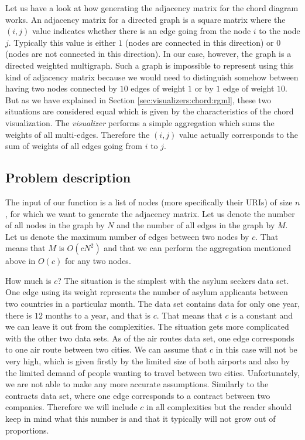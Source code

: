 Let us have a look at how generating the adjacency matrix for the chord diagram works. An adjacency matrix for a directed graph is a square matrix where the $(i, j)$ value indicates whether there is an edge going from the node $i$ to the node $j$. Typically this value is either $1$ (nodes are connected in this direction) or $0$ (nodes are not connected in this direction). In our case, however, the graph is a directed weighted multigraph. Such a graph is impossible to represent using this kind of adjacency matrix because we would need to distinguish somehow between having two nodes connected by $10$ edges of weight $1$ or by $1$ edge of weight $10$.  But as we have explained in Section \ref{sec:visualizers:chord:rgml}, these two situations are considered equal which is given by the characteristics of the chord visualization. The \emph{visualizer} performs a simple aggregation which sums the weights of all multi-edges. Therefore the $(i,j)$ value actually corresponds to the sum of weights of all edges going from $i$ to $j$.

\subsection{Problem description}

The input of our function is a list of nodes (more specifically their URIs) of size $n$, for which we want to generate the adjacency matrix. Let us denote the number of all nodes in the graph by $N$ and the number of all edges in the graph by $M$. Let us denote the maximum number of edges between two nodes by $c$. 
That means that $M$ is $O(cN^2)$ and that we can perform the aggregation mentioned above in $O(c)$ for any two nodes.

How much is $c$?  The situation is the simplest with the asylum seekers data set. One edge using its weight represents the number of asylum applicants between two countries in a particular month. The data set contains data for only one year, there is $12$ months to a year, and that is $c$. That means that $c$ is a constant and we can leave it out from the complexities. The situation gets more complicated with the other two data sets. As of the air routes data set, one edge corresponds to one air route between two cities. We can assume that $c$ in this case will not be very high, which is given firstly by the limited size of both airports and also by the limited demand of people wanting to travel between two cities. Unfortunately, we are not able to make any more accurate assumptions. Similarly to the contracts data set, where one edge corresponds to a contract between two companies. Therefore we will include $c$ in all complexities but the reader should keep in mind what this number is and that it typically will not grow out of proportions.

